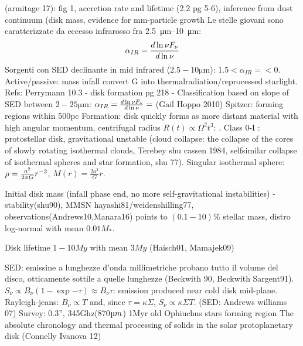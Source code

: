 \begin{workout}
	(armitage 17): fig 1, accretion rate and lifetime (2.2 pg 5-6), inference from dust continuum (disk mass, evidence for mm-particle growth
	Le stelle giovani sono caratterizzate da eccesso infrarosso fra \SIrange{2.5}{10}{\micro\meter}:
	\begin{equation}
	\alpha_{IR}=\frac{d \ln{\nu F_{\nu}}}{d \ln{\nu}}
	\end{equation}
	Sorgenti con SED declinante in mid infrared ($2.5-10\si{\micro\meter}$): $1.5<\alpha_{IR}=<0$. Active/passive: mass infall convert G into thermalradiation/reprocessed starlight.
	Refs: Perrymann 10.3 - disk formation pg 218 - 
	Classification based on slope of SED between $2-25\si{\micro\meter}$: $\alpha_{IR}=\frac{d \ln{\nu F_{\nu}}}{d \ln{\nu}}=$ (Gail Hoppo 2010)
	Spitzer: forming regions within 500pc
	Formation: disk quickly forms as more distant material with high angular momentum, centrifugal radius $R(t)\propto\Omega^2 t^3$: . Class 0-I : protostellar disk, gravitational unstable (cloud collapse: the collapse of the cores of slowly rotating isothermal clouds, Terebey shu cassen 1984, selfsimilar collapse of isothermal spheres and star formation, shu 77). Singular isothermal sphere: $\rho=\frac{a^2}{2\pi G}r^{-2}$, $M(r)=\frac{2a^2}{G}r$.
\end{workout}

\begin{workout}
	
	Initial disk mass
	(infall phase end, no more self-gravitational instabilities) - stability(shu90), MMSN hayashi81/weidenshilling77, observations(Andrews10,Manara16) points to $(0.1-10)\%$ stellar mass, distro log-normal with mean $0.01M_*$.
	
	{Disk lifetime}
	$1-10My$ with mean $3My$ (Haisch01, Mamajek09)
	
\end{workout}

\begin{workout}
	SED: emissine a lunghezze d'onda millimetriche probano tutto il volume del disco, otticamente sottile a quelle lunghezze (Beckwith 90, Beckwith Sargent91).
	$S_{\nu}\propto B_{\nu}(1-\exp{-\tau})\approx B_{\nu}\tau$: emission produced near cold disk mid-plane.
	Rayleigh-jeans: $B_{\nu}\propto T$ and, since $\tau=\kappa\Sigma$, $S_{\nu}\propto \kappa\Sigma T$.
	(SED: Andrews williams 07)
	Survey: 0.3'', 345Ghz(870$\micro m$) 1Myr old Ophiuchus stars forming region
	The absolute chronology and thermal processing of solids in the solar protoplanetary disk (Connelly Ivanova 12)
\end{workout}

